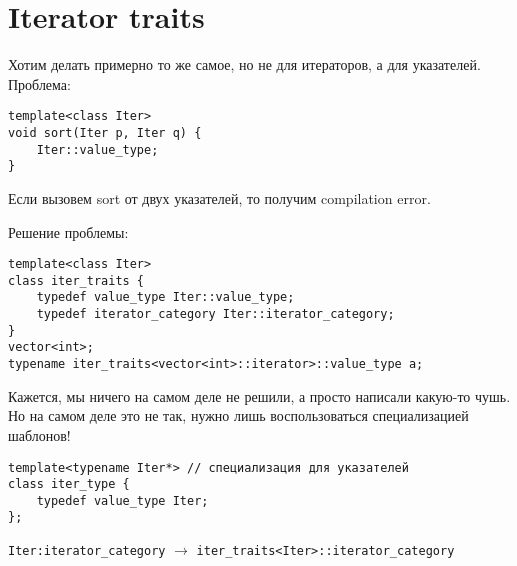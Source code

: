 \documentclass[a4paper,12pt]{article}
\newcommand{\ra}{\rightarrow}
\newcommand{\cc}{\texttt}
\begin{document}
\section{Iterator traits}
Хотим делать примерно то же самое, но не для итераторов, а для указателей.
Проблема:
\begin{verbatim}
template<class Iter>
void sort(Iter p, Iter q) {
    Iter::value_type;
}
\end{verbatim}
Если вызовем sort от двух указателей, то получим compilation error.

Решение проблемы:
\begin{verbatim}
template<class Iter>
class iter_traits {
    typedef value_type Iter::value_type;
    typedef iterator_category Iter::iterator_category;
}
vector<int>;
typename iter_traits<vector<int>::iterator>::value_type a;
\end{verbatim}

Кажется, мы ничего на самом деле не решили, а просто написали какую-то чушь. Но на самом деле это не так, нужно лишь воспользоваться специализацией шаблонов!

\begin{verbatim}
template<typename Iter*> // специализация для указателей
class iter_type {
    typedef value_type Iter;
};
\end{verbatim}
\cc{Iter:iterator_category} $\ra$ \cc{iter_traits<Iter>::iterator_category}
\end{document}
